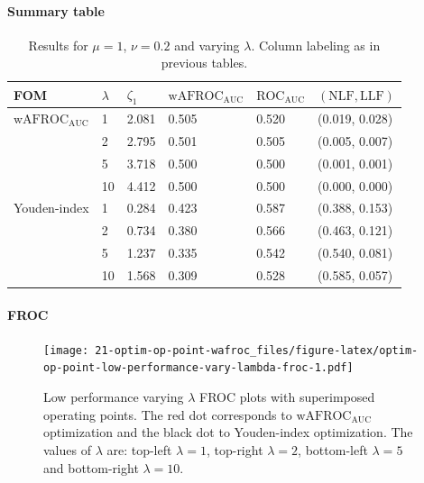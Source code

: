 \documentclass[
]{book}
\begin{document}
\hypertarget{summary-table-7}{%
\paragraph{Summary table}\label{summary-table-7}}

\begin{table}

\caption{\label{tab:optim-op-point-low-performance-vary-lambda-table}Results for $\mu = 1$, $\nu = 0.2$ and varying $\lambda$. Column labeling as in previous tables.}
\centering
\fontsize{10}{12}\selectfont
\begin{tabular}[t]{llllll}
\toprule
FOM & $\lambda$ & $\zeta_1$ & $\text{wAFROC}_\text{AUC}$ & $\text{ROC}_\text{AUC}$ & $\left( \text{NLF}, \text{LLF}\right)$\\
\midrule
$\text{wAFROC}_\text{AUC}$ & 1 & 2.081 & 0.505 & 0.520 & (0.019, 0.028)\\
 & 2 & 2.795 & 0.501 & 0.505 & (0.005, 0.007)\\
 & 5 & 3.718 & 0.500 & 0.500 & (0.001, 0.001)\\
 & 10 & 4.412 & 0.500 & 0.500 & (0.000, 0.000)\\
Youden-index & 1 & 0.284 & 0.423 & 0.587 & (0.388, 0.153)\\
\addlinespace
 & 2 & 0.734 & 0.380 & 0.566 & (0.463, 0.121)\\
 & 5 & 1.237 & 0.335 & 0.542 & (0.540, 0.081)\\
 & 10 & 1.568 & 0.309 & 0.528 & (0.585, 0.057)\\
\bottomrule
\end{tabular}
\end{table}

\hypertarget{froc-8}{%
\paragraph{FROC}\label{froc-8}}

\begin{figure}
\centering
\texttt{[image: 21-optim-op-point-wafroc\_files/figure-latex/optim-op-point-low-performance-vary-lambda-froc-1.pdf]}
\caption{\label{fig:optim-op-point-low-performance-vary-lambda-froc}Low performance varying \(\lambda\) FROC plots with superimposed operating points. The red dot corresponds to \(\text{wAFROC}_\text{AUC}\) optimization and the black dot to Youden-index optimization. The values of \(\lambda\) are: top-left \(\lambda = 1\), top-right \(\lambda = 2\), bottom-left \(\lambda = 5\) and bottom-right \(\lambda = 10\).}
\end{figure}
\end{document}
